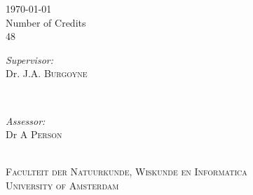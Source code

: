 \begin{titlepage}
\begin{fullwidth}
        {\Large \today}\\[1cm] %
        
        Number of Credits\\ %
        48\\[1cm]%
        
        \begin{minipage}[t]{0.4\textwidth}
        \begin{flushleft} \large
        \emph{Supervisor:} \\
        Dr. J.A. \textsc{Burgoyne}%
        \end{flushleft}
        \end{minipage}
        ~
        \begin{minipage}[t]{0.4\textwidth}
        \begin{flushright} \large
        \emph{Assessor:} \\
        Dr A  \textsc{Person}\\
        \end{flushright}
        \end{minipage}\\[2cm]
        
        
        \textsc{Faculteit der Natuurkunde, Wiskunde en Informatica}\\[1.0cm]
        \textsc{\large University of Amsterdam}\\[1.0cm] %
        
        
        \vfill %
    \end{fullwidth}
\end{titlepage}